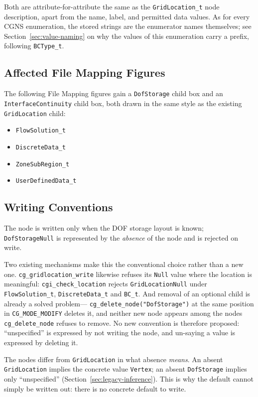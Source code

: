 \documentclass[11pt,letterpaper]{article}
\begin{document}
\noindent Both are attribute-for-attribute the same as the
\texttt{GridLocation\_t} node description, apart from the name, label,
and permitted data values.  As for every CGNS enumeration, the stored
strings are the enumerator names themselves; see
Section~\ref{sec:value-naming} on why the values of this enumeration
carry a prefix, following \texttt{BCType\_t}.

\subsection{Affected File Mapping Figures}

The following File Mapping figures gain a \texttt{DofStorage} child box
and an \texttt{InterfaceContinuity} child box, both drawn in the same
style as the existing \texttt{GridLocation} child:

\begin{itemize}[leftmargin=2em]
\item \texttt{FlowSolution\_t}
\item \texttt{DiscreteData\_t}
\item \texttt{ZoneSubRegion\_t}
\item \texttt{UserDefinedData\_t}
\end{itemize}

\subsection{Writing Conventions}

The node is written only when the DOF storage layout is known;
\texttt{DofStorageNull} is represented by the \emph{absence} of the node
and is rejected on write.

Two existing mechanisms make this the conventional choice rather than a
new one.  \texttt{cg\_gridlocation\_write} likewise refuses its
\texttt{Null} value where the location is meaningful:
\texttt{cgi\_check\_location} rejects \texttt{GridLocationNull} under
\texttt{FlowSolution\_t}, \texttt{DiscreteData\_t} and \texttt{BC\_t}.
And removal of an optional child is already a solved problem---
\texttt{cg\_delete\_node("DofStorage")} at the same position in
\texttt{CG\_MODE\_MODIFY} deletes it, and neither new node appears among
the nodes \texttt{cg\_delete\_node} refuses to remove.  No new convention
is therefore proposed: ``unspecified'' is expressed by not writing the
node, and un-saying a value is expressed by deleting it.

The nodes differ from \texttt{GridLocation} in what absence
\emph{means}.  An absent \texttt{GridLocation} implies the concrete value
\texttt{Vertex}; an absent \texttt{DofStorage} implies only
``unspecified'' (Section~\ref{sec:legacy-inference}).  This is why the
default cannot simply be written out: there is no concrete default to
write.
\end{document}
